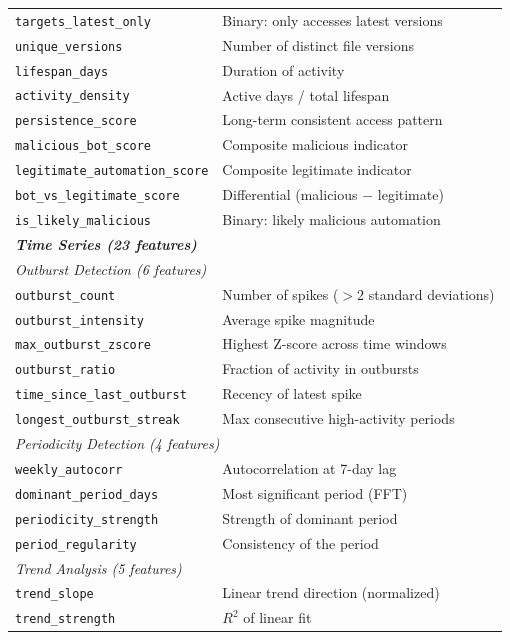 \documentclass[11pt,a4paper]{article}
\begin{document}
\begin{longtable}{p{5.2cm}p{9.3cm}}
\texttt{targets\_latest\_only} & Binary: only accesses latest versions \\
\texttt{unique\_versions} & Number of distinct file versions \\
\texttt{lifespan\_days} & Duration of activity \\
\texttt{activity\_density} & Active days / total lifespan \\
\texttt{persistence\_score} & Long-term consistent access pattern \\
\texttt{malicious\_bot\_score} & Composite malicious indicator \\
\texttt{legitimate\_auto\-mation\_score} & Composite legitimate indicator \\
\texttt{bot\_vs\_legit\-imate\_score} & Differential (malicious $-$ legitimate) \\
\texttt{is\_likely\_malicious} & Binary: likely malicious automation \\
\midrule
\multicolumn{2}{l}{\textit{\textbf{Time Series (23 features)}}} \\
\multicolumn{2}{l}{\textit{Outburst Detection (6 features)}} \\
\texttt{outburst\_count} & Number of spikes ($>2$ standard deviations) \\
\texttt{outburst\_intensity} & Average spike magnitude \\
\texttt{max\_outburst\_zscore} & Highest Z-score across time windows \\
\texttt{outburst\_ratio} & Fraction of activity in outbursts \\
\texttt{time\_since\_last\_outburst} & Recency of latest spike \\
\texttt{longest\_outburst\_streak} & Max consecutive high-activity periods \\
\midrule
\multicolumn{2}{l}{\textit{Periodicity Detection (4 features)}} \\
\texttt{weekly\_autocorr} & Autocorrelation at 7-day lag \\
\texttt{dominant\_period\_days} & Most significant period (FFT) \\
\texttt{periodicity\_strength} & Strength of dominant period \\
\texttt{period\_regularity} & Consistency of the period \\
\midrule
\multicolumn{2}{l}{\textit{Trend Analysis (5 features)}} \\
\texttt{trend\_slope} & Linear trend direction (normalized) \\
\texttt{trend\_strength} & $R^2$ of linear fit \\

\end{longtable}
\end{document}
